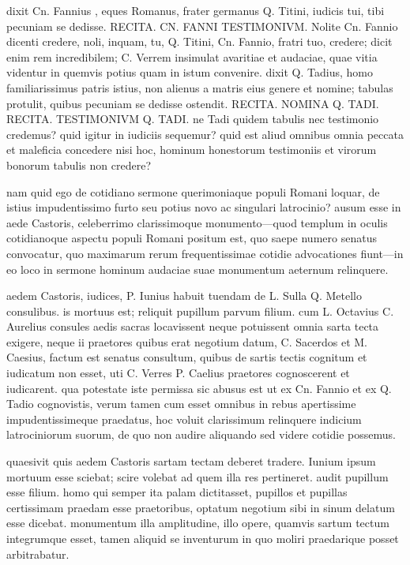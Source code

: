  dixit Cn. Fannius , eques Romanus, frater germanus Q. Titini, iudicis tui, tibi pecuniam se dedisse. RECITA. CN. FANNI TESTIMONIVM. Nolite Cn. Fannio dicenti credere, noli, inquam, tu, Q. Titini, Cn. Fannio, fratri tuo, credere; dicit enim rem incredibilem; C. Verrem insimulat avaritiae et audaciae, quae vitia videntur in quemvis potius quam in istum convenire. dixit Q. Tadius, homo familiarissimus patris istius, non alienus a matris eius genere et nomine; tabulas protulit, quibus pecuniam se dedisse ostendit. RECITA. NOMINA Q. TADI. RECITA. TESTIMONIVM Q. TADI. ne Tadi quidem tabulis nec testimonio credemus? quid igitur in iudiciis sequemur? quid est aliud omnibus omnia peccata et maleficia concedere nisi hoc, hominum honestorum testimoniis et virorum bonorum tabulis non credere?

 nam quid ego de cotidiano sermone querimoniaque populi Romani loquar, de istius impudentissimo furto seu potius novo ac singulari latrocinio? ausum esse in aede Castoris, celeberrimo clarissimoque monumento—quod templum in oculis cotidianoque aspectu populi Romani positum est, quo saepe numero senatus convocatur, quo maximarum rerum frequentissimae cotidie advocationes fiunt—in eo loco in sermone hominum audaciae suae monumentum aeternum relinquere.

 aedem Castoris, iudices, P. Iunius habuit tuendam de L. Sulla Q. Metello consulibus. is mortuus est; reliquit pupillum parvum filium. cum L. Octavius C. Aurelius consules aedis sacras locavissent neque potuissent omnia sarta tecta exigere, neque ii praetores quibus erat negotium datum, C. Sacerdos et M. Caesius, factum est senatus consultum, quibus de sartis tectis cognitum et iudicatum non esset, uti C. Verres P. Caelius praetores cognoscerent et iudicarent. qua potestate iste permissa sic abusus est ut ex Cn. Fannio et ex Q. Tadio cognovistis, verum tamen cum esset omnibus in rebus apertissime impudentissimeque praedatus, hoc voluit clarissimum relinquere indicium latrociniorum suorum, de quo non audire aliquando sed videre cotidie possemus.

 quaesivit quis aedem Castoris sartam tectam deberet tradere. Iunium ipsum mortuum esse sciebat; scire volebat ad quem illa res pertineret. audit pupillum esse filium. homo qui semper ita palam dictitasset, pupillos et pupillas certissimam praedam esse praetoribus, optatum negotium sibi in sinum delatum esse dicebat. monumentum illa amplitudine, illo opere, quamvis sartum tectum integrumque esset, tamen aliquid se inventurum in quo moliri praedarique posset arbitrabatur.

